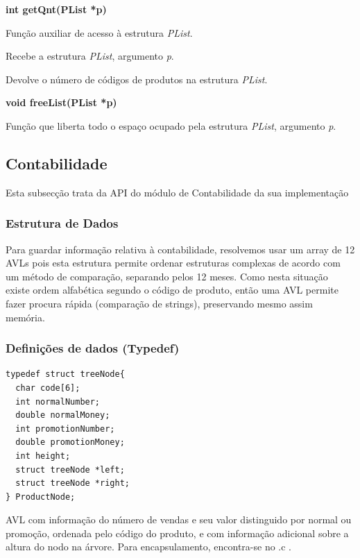 \documentclass[10pt] {article}
\begin{document}
\noindent \textbf{int getQnt(PList *p)}
\par Função auxiliar de acesso à estrutura \emph{PList}.
\par Recebe a estrutura \emph{PList}, argumento \emph{p}.
\par Devolve o número de códigos de produtos na estrutura \emph{PList}.

\noindent \textbf{void freeList(PList *p)}
\par Função que liberta todo o espaço ocupado pela estrutura \emph{PList}, argumento \emph{p}.



\newpage
\subsection{Contabilidade}
\par Esta subsecção trata da API do módulo de Contabilidade da sua implementação

\subsubsection{Estrutura de Dados}
\par
Para guardar informação relativa à contabilidade, resolvemos usar um array de 12 AVLs pois esta estrutura permite ordenar estruturas complexas de acordo com um método de comparação, separando pelos 12 meses. Como nesta situação existe ordem alfabética segundo o código de produto, então uma AVL permite fazer procura rápida (comparação de strings), preservando mesmo assim memória. 

\subsubsection{Definições de dados (Typedef)}

\begin{lstlisting}
typedef struct treeNode{
  char code[6];
  int normalNumber;
  double normalMoney;
  int promotionNumber;
  double promotionMoney;
  int height;
  struct treeNode *left;
  struct treeNode *right;
} ProductNode;
\end{lstlisting}

\par AVL com informação do número de vendas e seu valor distinguido por normal ou promoção, ordenada pelo código do produto, e com informação adicional sobre a altura do nodo na árvore. Para encapsulamento, encontra-se no .c .
\end{document}
